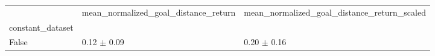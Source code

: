 \begin{tabular}{lll}
\toprule
 & mean_normalized_goal_distance_return & mean_normalized_goal_distance_return_scaled \\
constant_dataset &  &  \\
\midrule
False & 0.12 $\pm$ 0.09 & 0.20 $\pm$ 0.16 \\
\bottomrule
\end{tabular}
